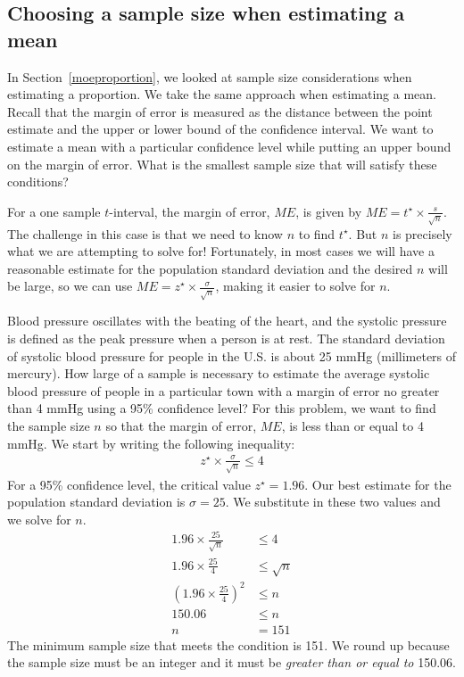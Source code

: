 \D{\newpage}

\subsection{Choosing a sample size when estimating a mean}
\label{findingASampleSizeForACertainME}

In Section~\ref{moeproportion}, we looked at sample size considerations when estimating a proportion.  We take the same approach when estimating a mean.  Recall that the margin of error is measured as the distance between the point estimate and the upper or lower bound of the confidence interval.  We want to estimate a mean with a particular confidence level while putting an upper bound on the margin of error.  What is the smallest sample size that will satisfy these conditions?

For a one sample $t$-interval, the margin of error, $ME$, is given by $ME = t^{\star}\times\frac{s}{\sqrt{n}}$.  The challenge in this case is that we need to know $n$ to find $t^{\star}$.  But $n$ is precisely what we are attempting to solve for!  Fortunately, in most cases we will have a reasonable estimate for the population standard deviation and the desired $n$ will be large, so we can use $ME = z^{\star}\times\frac{\sigma}{\sqrt{n}}$, making it easier to solve for $n$.   

\begin{examplewrap}
\begin{nexample}{Blood pressure oscillates with the beating of the heart, and the systolic pressure is defined as the peak pressure when a person is at rest. The standard deviation of systolic blood pressure for people in the U.S. is about 25 mmHg (millimeters of mercury).  How large of a sample is necessary to estimate the average systolic blood pressure of people in a particular town with a margin of error no greater than 4 mmHg using a 95\% confidence level?}\label{sampleSizeComputationForSystolicBloodPressure}
 For this problem, we want to find the sample size $n$ so that the margin of error, $ME$, is less than or equal to 4 mmHg.  We start by writing the following inequality:\vspace{-1mm}
\begin{align*}
z^{\star}\times \frac{\sigma}{\sqrt{n}} \leq 4
\end{align*}
For a 95\% confidence level, the critical value $z^{\star}=1.96$.  Our best estimate for the population standard deviation is $\sigma = 25$.  We substitute in these two values and we solve for $n$.
\begin{align*}
1.96\times\frac{25}{\sqrt{n}}
	&\leq 4 \\
1.96\times\frac{25}{4} &\leq \sqrt{n} \\
\left(1.96\times\frac{25}{4}\right)^2 &\leq n \\
150.06 &\leq n \\
 n &= 151
\end{align*}
The minimum sample size that meets the condition is 151. We round up because the sample size must be an integer and it must be \emph{greater than or equal to} 150.06.
\end{nexample}
\end{examplewrap}


